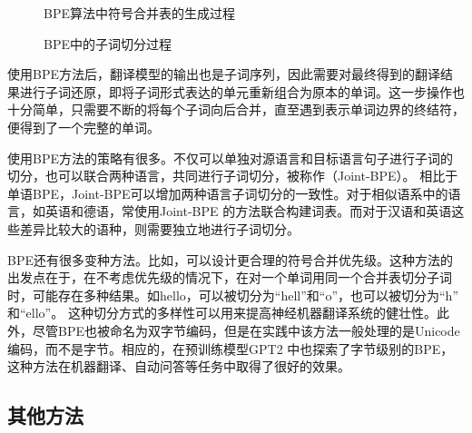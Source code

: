 \begin{figure}[htp]
\centering

\caption{BPE算法中符号合并表的生成过程}
\label{fig:13-2}
\end{figure}

\begin{figure}[htp]
\centering

\caption{BPE中的子词切分过程}
\label{fig:13-3}
\end{figure}

\parinterval 使用BPE方法后，翻译模型的输出也是子词序列，因此需要对最终得到的翻译结果进行子词还原，即将子词形式表达的单元重新组合为原本的单词。这一步操作也十分简单，只需要不断的将每个子词向后合并，直至遇到表示单词边界的终结符，便得到了一个完整的单词。

\parinterval 使用BPE方法的策略有很多。不仅可以单独对源语言和目标语言句子进行子词的切分，也可以联合两种语言，共同进行子词切分，被称作{\small{}}（Joint-BPE）。 相比于单语BPE，Joint-BPE可以增加两种语言子词切分的一致性。对于相似语系中的语言，如英语和德语，常使用Joint-BPE 的方法联合构建词表。而对于汉语和英语这些差异比较大的语种，则需要独立地进行子词切分。

\parinterval BPE还有很多变种方法。比如，可以设计更合理的符号合并优先级。这种方法的出发点在于，在不考虑优先级的情况下，在对一个单词用同一个合并表切分子词时，可能存在多种结果。如hello，可以被切分为“hell”和“o”，也可以被切分为“h” 和“ello”。 这种切分方式的多样性可以用来提高神经机器翻译系统的健壮性。此外，尽管BPE也被命名为双字节编码，但是在实践中该方法一般处理的是Unicode编码，而不是字节。相应的，在预训练模型GPT2 中也探索了字节级别的BPE，这种方法在机器翻译、自动问答等任务中取得了很好的效果。


\subsection{其他方法}

